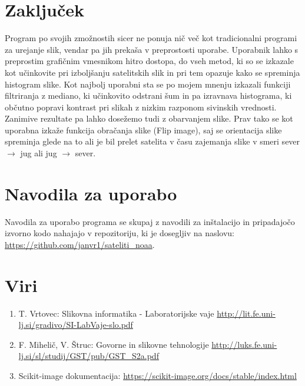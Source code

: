 \documentclass[a4paper, twocolumn]{article}
\begin{document}
\section{Zaključek}
Program po svojih zmožnostih sicer ne ponuja nič več kot tradicionalni programi za urejanje slik, vendar pa jih prekaša v preprostosti uporabe. Uporabnik lahko s preprostim grafičnim vmesnikom hitro dostopa, do vseh metod, ki so se izkazale kot učinkovite pri izboljšanju satelitskih slik in pri tem opazuje kako se spreminja histogram slike. Kot najbolj uporabni sta se po mojem mnenju izkazali funkciji filtriranja z mediano, ki učinkovito odstrani šum in pa izravnava histograma, ki občutno popravi kontrast pri slikah z nizkim razponom sivinskih vrednosti. Zanimive rezultate pa lahko dosežemo tudi z obarvanjem slike. Prav tako se kot uporabna izkaže funkcija obračanja slike (Flip image), saj se orientacija slike spreminja glede na to ali je bil prelet satelita v času zajemanja slike v smeri sever $\rightarrow$ jug ali jug $\rightarrow$ sever.

\section{Navodila za uporabo}
Navodila za uporabo programa se skupaj z navodili za inštalacijo in pripadajočo izvorno kodo nahajajo v repozitoriju, ki je dosegljiv na naslovu:\\
\url{https://github.com/janvr1/sateliti_noaa}.

\small
\section{Viri}
\begin{enumerate}
	\item T. Vrtovec: Slikovna informatika - Laboratorijske vaje \url{http://lit.fe.uni-lj.si/gradivo/SI-LabVaje-slo.pdf}
	\item F. Mihelič, V. Štruc: Govorne in slikovne tehnologije
	\url{http://luks.fe.uni-lj.si/sl/studij/GST/pub/GST_S2a.pdf}
	\item Scikit-image dokumentacija: \url{https://scikit-image.org/docs/stable/index.html}
\end{enumerate}

	
\end{document}
